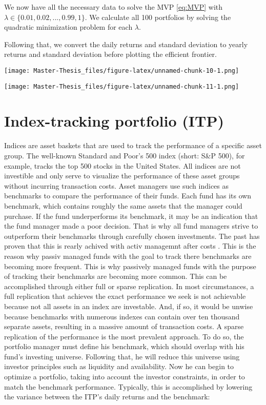 \documentclass[
  oneside]{book}
\begin{document}
We now have all the necessary data to solve the MVP \eqref{eq:MVP} with \(\lambda \in \{0.01, 0.02, ..., 0.99, 1\}\). We calculate all 100 portfolios by solving the quadratic minimization problem for each \(\lambda\).

Following that, we convert the daily returns and standard deviation to yearly returns and standard deviation before plotting the efficient frontier.

\texttt{[image: Master-Thesis\_files/figure-latex/unnamed-chunk-10-1.png]}

\texttt{[image: Master-Thesis\_files/figure-latex/unnamed-chunk-11-1.png]}

\hypertarget{index-tracking-portfolio-itp}{%
\section{Index-tracking portfolio (ITP)}\label{index-tracking-portfolio-itp}}

Indices are asset baskets that are used to track the performance of a specific asset group. The well-known Standard and Poor's 500 index (short: S\&P 500), for example, tracks the top 500 stocks in the United States. All indices are not investible and only serve to visualize the performance of these asset groups without incurring transaction costs. Asset managers use such indices as benchmarks to compare the performance of their funds. Each fund has its own benchmark, which contains roughly the same assets that the manager could purchase. If the fund underperforms its benchmark, it may be an indication that the fund manager made a poor decision. That is why all fund managers strive to outperform their benchmarks through carefully chosen investments. The past has proven that this is rearly achived with activ managemnt after costs \citep{Desm2016}. This is the reason why passiv managed funds with the goal to track there benchmarks are becoming more frequent. This is why passively managed funds with the purpose of tracking their benchmarks are becoming more common. This can be accomplished through either full or sparse replication. In most circumstances, a full replication that achieves the exact performance we seek is not achievable because not all assets in an index are investable. And, if so, it would be unwise because benchmarks with numerous indexes can contain over ten thousand separate assets, resulting in a massive amount of transaction costs. A sparse replication of the performance is the most prevalent approach. To do so, the portfolio manager must define his benchmark, which should overlap with his fund's investing universe. Following that, he will reduce this universe using investor principles such as liquidity and availability. Now he can begin to optimize a portfolio, taking into account the investor constraints, in order to match the benchmark performance. Typically, this is accomplished by lowering the variance between the ITP's daily returns and the benchmark:
\end{document}
